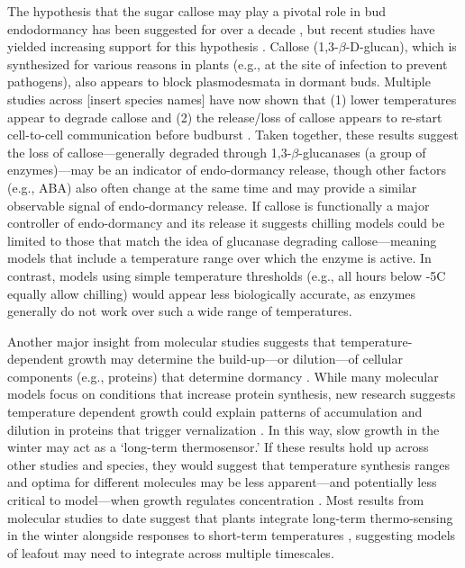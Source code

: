 \documentclass[11pt]{article}
\begin{document}
The hypothesis that the sugar callose may play a pivotal role in bud endodormancy has been suggested for over a decade \citep{rinne2011}, but recent studies have yielded increasing support for this hypothesis \citep{vanderschoot2014,pan2023epigenetic}. Callose (1,3-$\beta$-{\sc D}-glucan), which is synthesized for various reasons in plants (e.g., at the site of infection to prevent pathogens), also appears to block plasmodesmata in dormant buds. Multiple studies across [insert species names] have now shown that (1) lower temperatures appear to degrade callose and (2) the release/loss of callose appears to re-start cell-to-cell communication before budburst \citep{vanderschoot2014}. Taken together, these results suggest the loss of callose---generally degraded through 1,3-$\beta$-glucanases (a group of enzymes)---may be an indicator of endo-dormancy release, though other factors (e.g., ABA) also often change at the same time \citep{tylewicz2018photoperiodic,pan2021aba} and may provide a similar observable signal of endo-dormancy release. If callose is functionally a major controller of endo-dormancy and its release it suggests chilling models could be limited to those that match the idea of glucanase degrading callose---meaning models that include a temperature range over which the enzyme is active. In contrast, models using simple temperature thresholds (e.g., all hours below -5\degree C equally allow chilling) would appear less biologically accurate, as enzymes generally do not work over such a wide range of temperatures. 

Another major insight from molecular studies suggests that temperature-dependent growth may determine the build-up---or dilution---of cellular components (e.g., proteins) that determine dormancy \citep{zhao2020temperature,antoniou2021feeling}. While many molecular models focus on conditions that increase protein synthesis, new research suggests temperature dependent growth could explain patterns of accumulation and dilution in proteins that trigger vernalization \citep{zhao2020temperature}. In this way, slow growth in the winter may act as a `long-term thermosensor.' If these results hold up across other studies and species, they would suggest that temperature synthesis ranges and optima for different molecules may be less apparent---and potentially less critical to model---when growth regulates concentration \citep{zhao2020temperature}. Most results from molecular studies to date suggest that plants integrate long-term thermo-sensing in the winter alongside responses to short-term temperatures \citep{antoniou2021feeling,Satake2022}, suggesting models of leafout may need to integrate across multiple timescales. 
\end{document}
